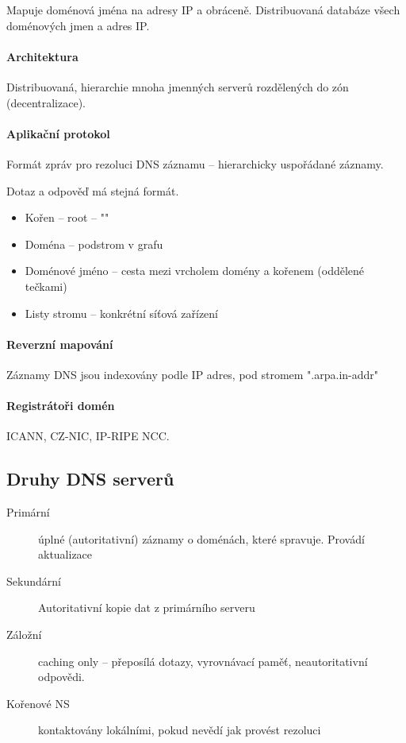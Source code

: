 \documentclass[a4paper, 11pt]{report}
\begin{document}
Mapuje doménová jména na adresy IP a obráceně. Distribuovaná databáze všech doménových jmen a adres IP.

\paragraph{Architektura}
Distribuovaná, hierarchie mnoha jmenných serverů rozdělených do zón (decentralizace).

\paragraph{Aplikační protokol}
Formát zpráv pro rezoluci DNS záznamu -- hierarchicky uspořádané záznamy.

Dotaz a odpověď má stejná formát.

\begin{itemize}
	\item Kořen -- root -- ""
	\item Doména -- podstrom v grafu
	\item Doménové jméno -- cesta mezi vrcholem domény a kořenem (oddělené tečkami)
	\item Listy stromu -- konkrétní síťová zařízení
\end{itemize}

\paragraph{Reverzní mapování}
Záznamy DNS jsou indexovány podle IP adres, pod stromem ".arpa.in-addr"

\paragraph{Registrátoři domén} ICANN, CZ-NIC, IP-RIPE NCC.

\subsection{Druhy DNS serverů}
\begin{description}
	\item[Primární] úplné (autoritativní) záznamy o doménách, které spravuje. Provádí aktualizace
	\item[Sekundární] Autoritativní kopie dat z primárního serveru
	\item[Záložní] caching only -- přeposílá dotazy, vyrovnávací paměť, neautoritativní odpovědi.
	\item[Kořenové NS] kontaktovány lokálními, pokud nevědí jak provést rezoluci
\end{description}
\end{document}
